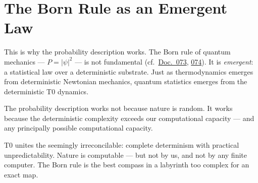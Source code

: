 \section{The Born Rule as an Emergent Law}

This is why the probability description works. The Born rule of quantum mechanics --- $P = |\psi|^2$ --- is not fundamental (cf.\ \href{https://github.com/jpascher/T0-Time-Mass-Duality/blob/main/2/pdf/073_QM-testen_De.pdf}{Doc.~073}, \href{https://github.com/jpascher/T0-Time-Mass-Duality/blob/main/2/pdf/074_NoGo_De.pdf}{074}). It is \emph{emergent}: a statistical law over a deterministic substrate. Just as thermodynamics emerges from deterministic Newtonian mechanics, quantum statistics emerges from the deterministic T0 dynamics.

The probability description works not because nature is random. It works because the deterministic complexity exceeds our computational capacity --- and any principally possible computational capacity.

\begin{kerngedanke}
T0 unites the seemingly irreconcilable: complete determinism with practical unpredictability. Nature is computable --- but not by us, and not by any finite computer. The Born rule is the best compass in a labyrinth too complex for an exact map.
\end{kerngedanke}
